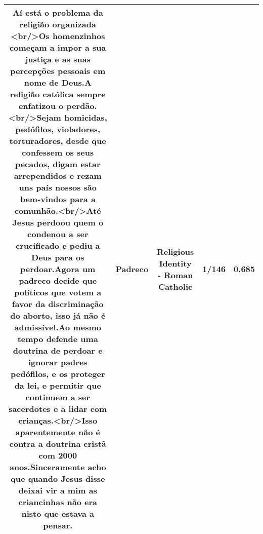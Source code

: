 \documentclass[11pt]{article}
\newlength\mylength
\begin{document}
\begin{center}
\begin{longtable}{|C{.65\mylength}|C{.30\mylength}|C{.12\mylength}|C{.12\mylength}|C{.12\mylength}|}
  \small Aí está o problema da religião organizada <br/>Os homenzinhos começam a impor a sua justiça e as suas percepções pessoais em nome de Deus.A religião católica sempre enfatizou o perdão.<br/>Sejam homicidas, pedófilos, violadores, torturadores, desde que confessem os seus pecados, digam estar arrependidos e rezam uns país nossos são bem-vindos para a comunhão.<br/>Até Jesus perdoou quem o condenou a ser crucificado e pediu a Deus para os perdoar.Agora um \textbf{padreco} decide que políticos que votem a favor da discriminação do aborto, isso já não é admissível.Ao mesmo tempo defende uma doutrina de perdoar e ignorar padres pedófilos, e os proteger da lei, e permitir que continuem a ser sacerdotes e a lidar com crianças.<br/>Isso aparentemente não é contra a doutrina cristã com 2000 anos.Sinceramente acho que quando Jesus disse deixai vir a mim as criancinhas não era nisto que estava a pensar.\normalsize   & Padreco & Religious Identity - Roman Catholic & 1/146 & 0.685 \\  \hline
  
\end{longtable}
\end{center}
\end{document}
